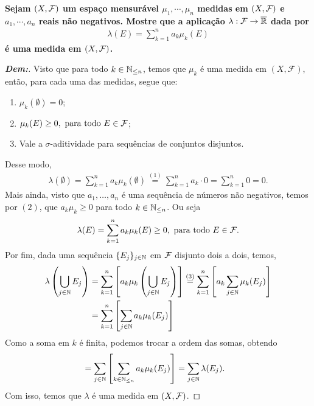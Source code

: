 \newpage
{}
\myexe{\thedois}
\bigline
\textbf{Sejam $(X, \mathcal F)$ um espaço mensurável $\mu_1, \cdots, \mu_n$ medidas em 
$(X, \mathcal F)$ e $a_1, \cdots, a_n$ reais não negativos. Mostre que a aplicação 
$\lambda: \mathcal F \rightarrow \overline {\mathbb R}$ dada por 
\begin{align*}
  \lambda(E) = \sum_{k=1}^{n} a_k\mu_k(E)
\end{align*}
é uma medida em $(X, \mathcal F)$.}
\begin{proof}[\textbf{Dem:}]
Visto que para todo $k \in \mathbb N_{\le n}$, temos que $\mu_k$ é uma medida em $(X, \mathcal F)$,
então, para cada uma das medidas, segue que:
\begin{enumerate}
  \item $\mu_k(\emptyset) = 0$; 
  \item $\mu_k(E) \ge 0, \text{ para todo } E \in \mathcal F$; 
  \item Vale a $\sigma$-aditividade para sequências de conjuntos disjuntos.
\end{enumerate}
Desse modo,
\begin{align*}
  \lambda(\emptyset) = \sum_{k=1}^{n} a_k\mu_k(\emptyset) \stackrel{(1)}{=} 
  \sum_{k=1}^{n} a_k \cdot0 = \sum_{k=1}^n 0 = 0. 
\end{align*}
Mais ainda, visto que $a_1, \dots, a_n$ é uma sequência de números não negativos,
  temos por $(2)$, que $a_k \mu_k \ge 0$ para todo $k \in \mathbb N_{\le n}$. Ou seja 
\begin{align*}
  \lambda(E) = \sum_{k=1}^n a_k \mu_k(E) \ge 0, \text{ para todo } E \in \mathcal F.
\end{align*}
  Por fim, dada uma sequência $\{E_j\}_{j \in \mathbb N}$ em $\mathcal F$ disjunto dois a dois,
  temos, 
  \begin{align*}
    \lambda\left(\bigcup\limits_{j\in \mathbb N} E_j \right) &= 
    \sum_{k=1}^{n} \left[a_k \mu_k\left(\bigcup\limits_{j\in \mathbb N} E_j\right)\right]
    \stackrel{(3)}{=}\sum_{k=1}^{n} \left[a_k \sum_{j \in \mathbb N}\mu_k(E_j)\right]\\ 
    &= \sum_{k=1}^{n} \left[\sum_{j \in \mathbb N}a_k\mu_k(E_j)\right]
    \end{align*}
Como a soma em $k$ é finita, podemos trocar a ordem das somas, obtendo
\begin{align*}
    &= \sum_{j \in \mathbb N} \left[\sum_{k \in \mathbb N_{\le n}}a_k\mu_k(E_j)\right]
    = \sum_{j \in \mathbb N} \lambda(E_j).
  \end{align*}
  Com isso, temos que $\lambda$ é uma medida em $(X, \mathcal F)$.
\end{proof}

